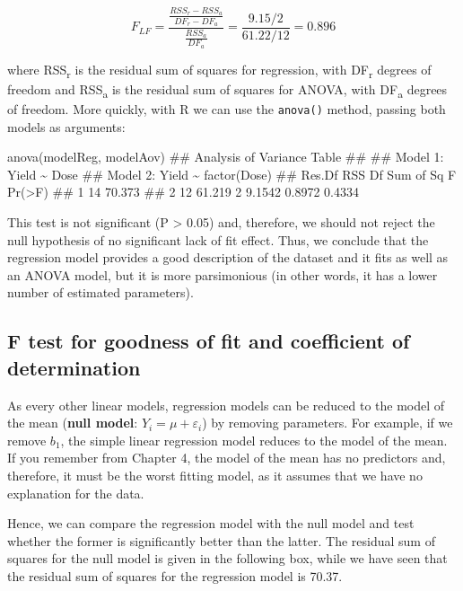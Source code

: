 \documentclass[a4paper,12pt,oneside]{book}
\newenvironment{Shaded}{\begin{snugshade}}{\end{snugshade}}
\newcommand{\DocumentationTok}[1]{#1}
\newcommand{\FunctionTok}[1]{#1}
\newcommand{\NormalTok}[1]{#1}
\begin{document}
\[F_{LF} = \frac{ \frac{RSS_r - RSS_a}{DF_r - DF_a} } {\frac{RSS_a}{DF_a}} = \frac{9.15 / 2}{61.22/12} = 0.896\]

where RSS\textsubscript{r} is the residual sum of squares for regression, with DF\textsubscript{r} degrees of freedom and RSS\textsubscript{a} is the residual sum of squares for ANOVA, with DF\textsubscript{a} degrees of freedom. More quickly, with R we can use the \texttt{anova()} method, passing both models as arguments:

\begin{Shaded}
\begin{Highlighting}[]
\FunctionTok{anova}\NormalTok{(modelReg, modelAov)}
\DocumentationTok{\#\# Analysis of Variance Table}
\DocumentationTok{\#\# }
\DocumentationTok{\#\# Model 1: Yield \textasciitilde{} Dose}
\DocumentationTok{\#\# Model 2: Yield \textasciitilde{} factor(Dose)}
\DocumentationTok{\#\#   Res.Df    RSS Df Sum of Sq      F Pr(\textgreater{}F)}
\DocumentationTok{\#\# 1     14 70.373                           }
\DocumentationTok{\#\# 2     12 61.219  2    9.1542 0.8972 0.4334}
\end{Highlighting}
\end{Shaded}

This test is not significant (P \textgreater{} 0.05) and, therefore, we should not reject the null hypothesis of no significant lack of fit effect. Thus, we conclude that the regression model provides a good description of the dataset and it fits as well as an ANOVA model, but it is more parsimonious (in other words, it has a lower number of estimated parameters).

\hypertarget{f-test-for-goodness-of-fit-and-coefficient-of-determination}{%
\subsection{F test for goodness of fit and coefficient of determination}\label{f-test-for-goodness-of-fit-and-coefficient-of-determination}}

As every other linear models, regression models can be reduced to the model of the mean (\textbf{null model}: \(Y_i = \mu + \varepsilon_i\)) by removing parameters. For example, if we remove \(b_1\), the simple linear regression model reduces to the model of the mean. If you remember from Chapter 4, the model of the mean has no predictors and, therefore, it must be the worst fitting model, as it assumes that we have no explanation for the data.

Hence, we can compare the regression model with the null model and test whether the former is significantly better than the latter. The residual sum of squares for the null model is given in the following box, while we have seen that the residual sum of squares for the regression model is 70.37.
\end{document}
